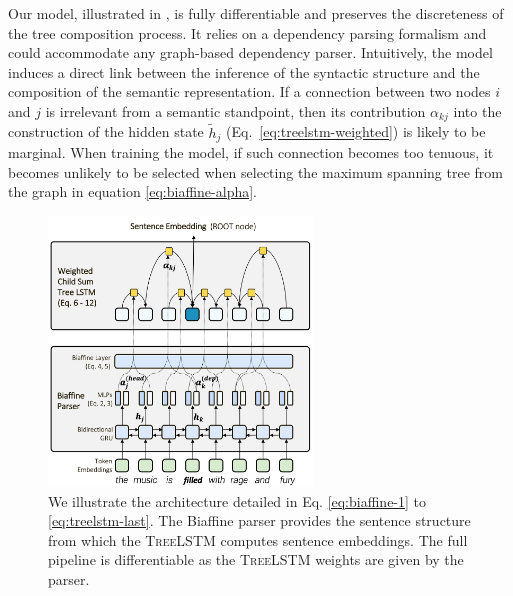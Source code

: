 

Our model, illustrated in , is fully differentiable and preserves the discreteness of the tree composition process. It relies on a dependency parsing formalism and could accommodate any graph-based dependency parser.
Intuitively, the model induces a direct link between the inference of the syntactic structure and the composition of the semantic representation. If a connection between two nodes $i$ and $j$ is irrelevant from a semantic standpoint, then its contribution $\alpha_{kj}$ into the construction of the hidden state $\tilde{h}_j$ (Eq.~\ref{eq:treelstm-weighted}) is likely to be marginal. When training the model, if such connection becomes too tenuous, it becomes unlikely to be selected when selecting the maximum spanning tree from the graph in equation \ref{eq:biaffine-alpha}.


\begin{figure}[!ht]
	\includegraphics[width=7cm]{images/biaffine-12.png}
	\caption[Biaffine tree lstm]{We illustrate the architecture detailed in Eq. \ref{eq:biaffine-1} to \ref{eq:treelstm-last}. The Biaffine parser provides the sentence structure from which the \textsc{TreeLSTM} computes sentence embeddings. The full pipeline is differentiable as the \textsc{TreeLSTM} weights are given by the parser.}
\end{figure}

